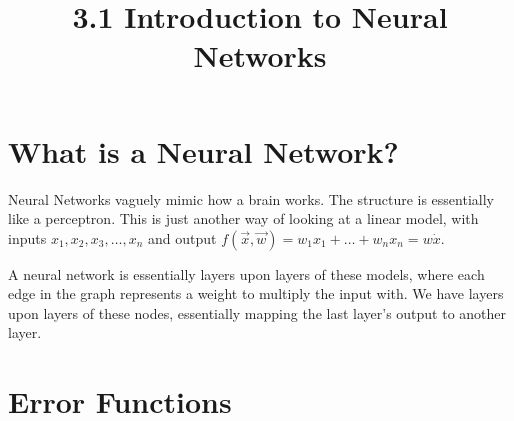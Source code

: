 \documentclass{article}
\title{3.1 Introduction to Neural Networks}
\begin{document}
\maketitle
\section{What is a Neural Network?}
Neural Networks vaguely mimic how a brain works. The structure is essentially
like a perceptron. 
This is just another way of looking at a linear model, with inputs $x_1, x_2,
x_3, \dots, x_n$ and output $f(\vec{x}, \vec{w}) = w_1x_1 + \dots + w_nx_n
= w \dot x$. 

A neural network is essentially layers upon layers of these models, %
where each edge in the graph represents a weight to multiply the input with. We
have layers upon layers of these nodes, essentially mapping the last layer's
output to another layer.

\section{Error Functions}
\end{document}
